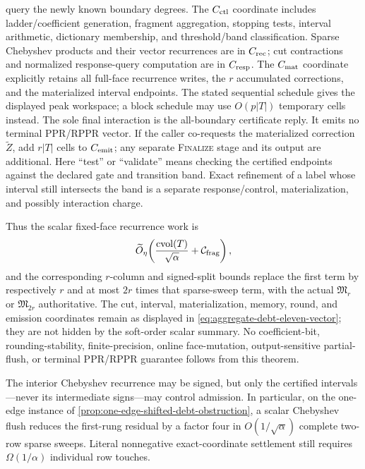 \begin{theorem}
query the newly known boundary degrees.  The $C_{\rm ctl}$ coordinate includes
ladder/coefficient generation,
fragment aggregation, stopping tests, interval arithmetic, dictionary
membership, and threshold/band classification.  Sparse Chebyshev products
and their vector recurrences are in $C_{\rm rec}$; cut contractions and
normalized response-query computation are in $C_{\rm resp}$.  The
$C_{\rm mat}$ coordinate explicitly retains all full-face recurrence writes,
the $r$ accumulated corrections, and the materialized interval endpoints.
The stated sequential schedule gives the displayed peak workspace; a block
schedule may use $O(p|T|)$ temporary cells instead.  The sole final
interaction is the all-boundary certificate reply.  It emits no terminal
PPR/RPPR vector.  If the caller co-requests the materialized correction
$\widetilde Z$, add $r|T|$ cells to $C_{\rm emit}$; any separate
\textsc{Finalize} stage and its output are additional.
Here ``test'' or ``validate'' means checking the certified endpoints against
the declared gate and transition band.  Exact refinement of a label whose
interval still intersects the band is a separate response/control,
materialization, and possibly interaction charge.

Thus the scalar fixed-face recurrence work is
\begin{equation}
 \widetilde O_\eta\!\left(
  \frac{\operatorname{cvol}(T)}{\sqrt\alpha}
  +\mathcal C_{\rm frag}
 \right),
 \label{eq:aggregate-debt-flush-work}
\end{equation}
and the corresponding $r$-column and signed-split bounds replace the first
term by respectively $r$ and at most $2r$ times that sparse-sweep term, with
the actual $\mathfrak M_r$ or $\mathfrak M_{2r}$ authoritative.  The cut,
interval, materialization, memory, round, and emission coordinates remain as
displayed in \cref{eq:aggregate-debt-eleven-vector}; they are not hidden by
the soft-order scalar summary.  No coefficient-bit, rounding-stability,
finite-precision, online face-mutation, output-sensitive partial-flush, or
terminal PPR/RPPR guarantee follows from this theorem.

The interior Chebyshev recurrence may be signed, but only the certified
intervals---never its intermediate signs---may control admission.  In
particular, on the one-edge instance of
\cref{prop:one-edge-shifted-debt-obstruction}, a scalar Chebyshev flush reduces
the first-rung residual by a factor four in $O(1/\sqrt\alpha)$ complete
two-row sparse sweeps.  Literal nonnegative exact-coordinate settlement still
requires $\Omega(1/\alpha)$ individual row touches.
\end{theorem}

